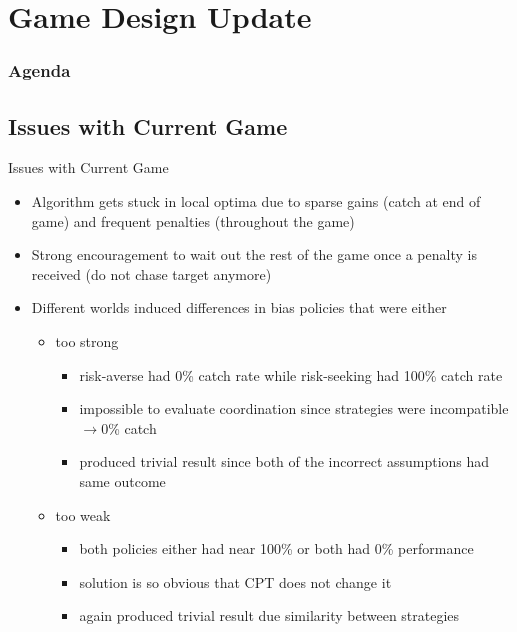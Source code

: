 \documentclass[aspectratio=1610, xcolor=dvipsnames]{packages/beamer}
\newcommand{\displayTOC}{\begin{frame}\frametitle{Agenda} \tableofcontents[currentsection, subsectionstyle=show/show/hide]\end{frame}}
\begin{document}
\section{Game Design Update} \displayTOC

\subsection{Issues with Current Game}
\begin{frame}{Issues with Current Game}
    \begin{itemize}
        \item Algorithm gets stuck in local optima due to sparse gains (catch at end of game) and frequent penalties (throughout the game)
        \item Strong encouragement to wait out the rest of the game once a penalty is received (do not chase target anymore)
        \item Different worlds induced differences in bias policies that were either
        \begin{itemize}
            \item too strong
            \begin{itemize}
                \item risk-averse had 0\% catch rate while risk-seeking had 100\% catch rate
                \item impossible to evaluate coordination since strategies were incompatible $\rightarrow 0$\% catch
                \item produced trivial result since both of the incorrect assumptions had same outcome
            \end{itemize}
            \item too weak
            \begin{itemize}
                \item both policies either had near 100\% or both had 0\% performance
                \item solution is so obvious that CPT does not change it
                \item again produced trivial result due similarity between strategies
            \end{itemize}
        \end{itemize}
    \end{itemize}
\end{frame}
\end{document}

